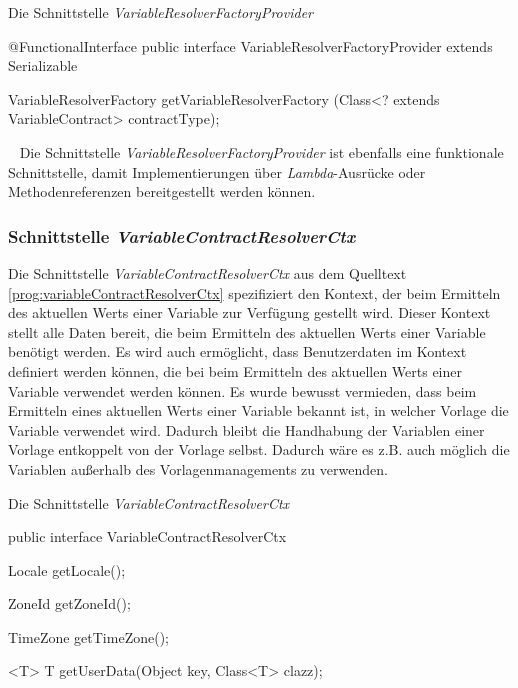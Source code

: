 \begin{program}[h]
\caption{Die Schnittstelle \emph{VariableResolverFactoryProvider}}
\label{prog:variableResolverFactoryProvider}
\begin{JavaCode}
@FunctionalInterface
public interface VariableResolverFactoryProvider extends Serializable {

    VariableResolverFactory getVariableResolverFactory
            (Class<? extends VariableContract> contractType);
            
}
\end{JavaCode}
\end{program}
\ \newline
Die Schnittstelle \emph{VariableResolverFactoryProvider} ist ebenfalls eine funktionale Schnittstelle, damit Implementierungen über \emph{Lambda}-Ausrücke oder  Methodenreferenzen bereitgestellt werden können.

\subsubsection{Schnittstelle \emph{VariableContractResolverCtx}}
\label{sec:variableResolverFactoryProvider}
Die Schnittstelle \emph{VariableContractResolverCtx} aus dem Quelltext  \ref{prog:variableContractResolverCtx} spezifiziert den Kontext, der beim Ermitteln des aktuellen Werts einer Variable zur Verfügung gestellt wird. Dieser Kontext stellt alle Daten bereit, die beim Ermitteln des aktuellen Werts einer Variable benötigt werden. Es wird auch ermöglicht, dass Benutzerdaten im Kontext definiert werden können, die bei beim Ermitteln des aktuellen Werts einer Variable verwendet werden können. Es wurde bewusst vermieden, dass beim Ermitteln eines aktuellen Werts einer Variable bekannt ist, in welcher Vorlage die Variable verwendet wird. Dadurch bleibt die Handhabung der Variablen einer Vorlage entkoppelt von der Vorlage selbst. Dadurch wäre es z.B. auch möglich die Variablen außerhalb des Vorlagenmanagements zu verwenden.

\begin{program}[h]
\caption{Die Schnittstelle \emph{VariableContractResolverCtx}}
\label{prog:variableContractResolverCtx}
\begin{JavaCode}
public interface VariableContractResolverCtx {

    Locale getLocale();

    ZoneId getZoneId();

    TimeZone getTimeZone();

    <T> T getUserData(Object key, Class<T> clazz);
    
}
\end{JavaCode}
\end{program}

